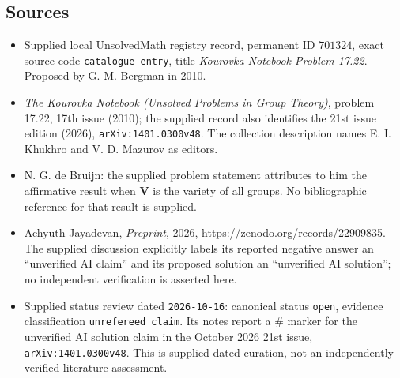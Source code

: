 \documentclass[11pt]{article}
\begin{document}
\subsection{Sources}
\begin{itemize}
\item Supplied local UnsolvedMath registry record, permanent ID \(701324\), exact source code \texttt{catalogue entry}, title \emph{Kourovka Notebook Problem 17.22}. Proposed by G. M. Bergman in 2010.
\item \emph{The Kourovka Notebook (Unsolved Problems in Group Theory)}, problem 17.22, 17th issue (2010); the supplied record also identifies the 21st issue edition (2026), \texttt{arXiv:1401.0300v48}. The collection description names E. I. Khukhro and V. D. Mazurov as editors.
\item N. G. de Bruijn: the supplied problem statement attributes to him the affirmative result when \(\mathbf V\) is the variety of all groups. No bibliographic reference for that result is supplied.
\item Achyuth Jayadevan, \emph{Preprint}, 2026, \url{https://zenodo.org/records/22909835}. The supplied discussion explicitly labels its reported negative answer an ``unverified AI claim'' and its proposed solution an ``unverified AI solution''; no independent verification is asserted here.
\item Supplied status review dated \texttt{2026-10-16}: canonical status \texttt{open}, evidence classification \texttt{unrefereed\_claim}. Its notes report a \(\#\) marker for the unverified AI solution claim in the October 2026 21st issue, \texttt{arXiv:1401.0300v48}. This is supplied dated curation, not an independently verified literature assessment.
\end{itemize}
\end{document}
